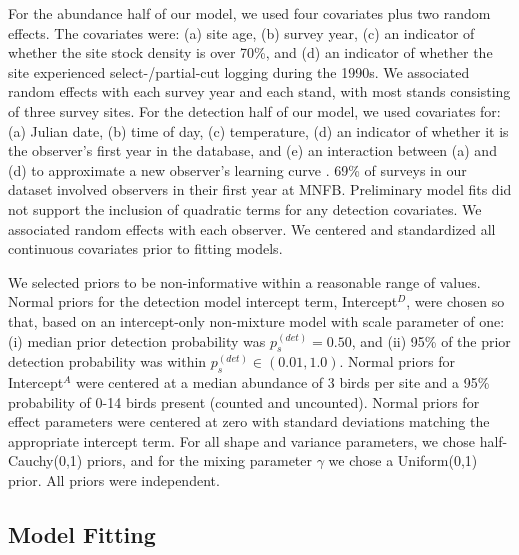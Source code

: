 \documentclass[useAMS,usenatbib,referee,12pt]{article}
\begin{document}
For the abundance half of our model, we used four covariates plus two random effects.  
The covariates were: (a) site age, (b) survey year, (c) an indicator of whether the site stock density is over 70\%, and (d) an indicator of whether the site experienced select-/partial-cut logging during the 1990s.  
We associated random effects with each survey year and each stand, with most stands consisting of three survey sites.  
For the detection half of our model, we used covariates for: (a) Julian date, (b) time of day, (c) temperature, (d) an indicator of whether it is the observer's first year in the database, and (e) an interaction between (a) and (d) to approximate a new observer's learning curve \citep{Alldredge2007}.  
69\% of surveys in our dataset involved observers in their first year at MNFB.  
Preliminary model fits did not support the inclusion of quadratic terms for any detection covariates.  
We associated random effects with each observer.  
We centered and standardized all continuous covariates prior to fitting models.

We selected priors to be non-informative within a reasonable range of values.  
Normal priors for the detection model intercept term, Intercept$^D$, were chosen so that, based on an intercept-only non-mixture model with scale parameter of one: (i) median prior detection probability was $p_{s}^{(det)} = 0.50$, and (ii) 95\% of the prior detection probability was within $p_{s}^{(det)} \in (0.01, 1.0)$.  
Normal priors for Intercept$^A$ were centered at a median abundance of 3 birds per site and a 95\% probability of 0-14 birds present (counted and uncounted).  
Normal priors for effect parameters were centered at zero with standard deviations matching the appropriate intercept term.  
For all shape and variance parameters, we chose half-Cauchy(0,1) priors, and for the mixing parameter $\gamma$ we chose a Uniform(0,1) prior.  
All priors were independent.





\subsection{Model Fitting}
\end{document}
